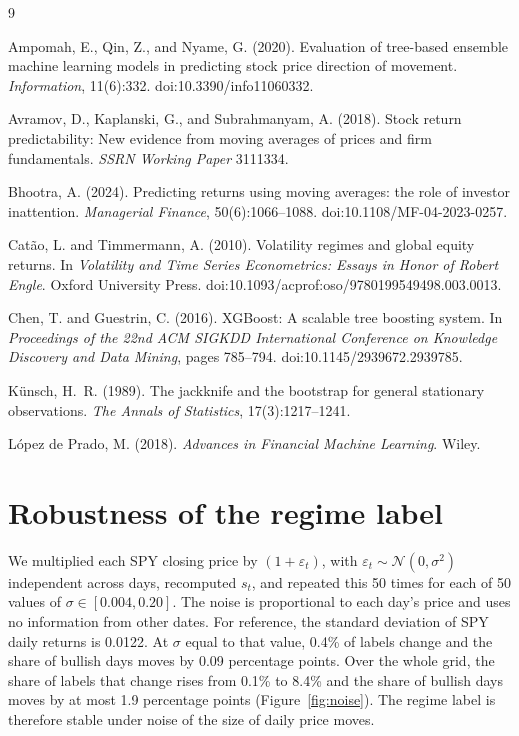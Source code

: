 \documentclass[11pt,a4paper]{article}
\begin{document}
\begin{thebibliography}{9}

Ampomah, E., Qin, Z., and Nyame, G. (2020).
\newblock Evaluation of tree-based ensemble machine learning models in predicting stock price
  direction of movement.
\newblock \emph{Information}, 11(6):332. doi:10.3390/info11060332.

Avramov, D., Kaplanski, G., and Subrahmanyam, A. (2018).
\newblock Stock return predictability: New evidence from moving averages of prices and firm
  fundamentals.
\newblock \emph{SSRN Working Paper} 3111334.

Bhootra, A. (2024).
\newblock Predicting returns using moving averages: the role of investor inattention.
\newblock \emph{Managerial Finance}, 50(6):1066--1088. doi:10.1108/MF-04-2023-0257.

Cat{\~a}o, L. and Timmermann, A. (2010).
\newblock Volatility regimes and global equity returns.
\newblock In \emph{Volatility and Time Series Econometrics: Essays in Honor of Robert Engle}.
  Oxford University Press. doi:10.1093/acprof:oso/9780199549498.003.0013.

Chen, T. and Guestrin, C. (2016).
\newblock XGBoost: A scalable tree boosting system.
\newblock In \emph{Proceedings of the 22nd ACM SIGKDD International Conference on Knowledge
  Discovery and Data Mining}, pages 785--794. doi:10.1145/2939672.2939785.

K{\"u}nsch, H.~R. (1989).
\newblock The jackknife and the bootstrap for general stationary observations.
\newblock \emph{The Annals of Statistics}, 17(3):1217--1241.

L{\'o}pez de Prado, M. (2018).
\newblock \emph{Advances in Financial Machine Learning}.
\newblock Wiley.

\end{thebibliography}

\clearpage
\appendix
\section{Robustness of the regime label}\label{app:noise}

We multiplied each SPY closing price by $(1+\varepsilon_t)$, with $\varepsilon_t\sim\mathcal{N}(0,\sigma^2)$
independent across days, recomputed $s_t$, and repeated this 50 times for each of 50 values of
$\sigma\in[0.004, 0.20]$. The noise is proportional to each day's price and uses no information
from other dates. For reference, the standard deviation of SPY daily returns is 0.0122. At
$\sigma$ equal to that value, 0.4\% of labels change and the share of bullish days moves by 0.09
percentage points. Over the whole grid, the share of labels that change rises from 0.1\% to 8.4\%
and the share of bullish days moves by at most 1.9 percentage points (Figure~\ref{fig:noise}).
The regime label is therefore stable under noise of the size of daily price moves.
\end{document}
